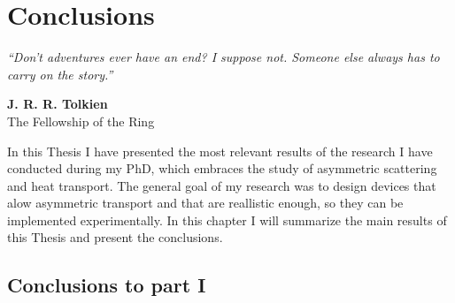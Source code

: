 
\chapter*{Conclusions}
\label{Conclusions}
\null
\textit{``Don't adventures ever have an end? I suppose not. Someone else always has to carry on the story.''}
\begin{flushright}
  {\bf J. R. R. Tolkien}\\
  The Fellowship of the Ring
\end{flushright}
\null

In this Thesis I have presented the most relevant results of the research I have conducted during my PhD, which embraces the study of asymmetric scattering and heat transport. The general goal of my research was to design devices that alow asymmetric transport and that are reallistic enough, so they can be implemented experimentally. In this chapter I will summarize the main results of this Thesis and present the conclusions.



\section*{Conclusions to part I}

